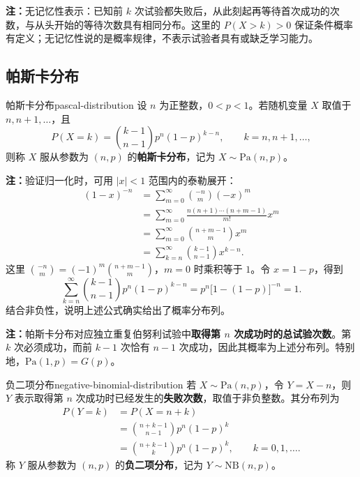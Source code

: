 \textbf{注：}\quad 无记忆性表示：已知前 $k$ 次试验都失败后，从此刻起再等待首次成功的次数，与从头开始的等待次数具有相同分布。这里的 $P(X>k)>0$ 保证条件概率有定义；无记忆性说的是概率规律，不表示试验者具有或缺乏学习能力。

\subsection*{帕斯卡分布}

\begin{mydefinition}{帕斯卡分布}{pascal-distribution}
设 $n$ 为正整数，$0<p<1$。若随机变量 $X$ 取值于 $n,n+1,\ldots$，且
\[
P(X=k)=\binom{k-1}{n-1}p^n(1-p)^{k-n},
\qquad k=n,n+1,\ldots,
\]
则称 $X$ 服从参数为 $(n,p)$ 的\textbf{帕斯卡分布}，记为 $X\sim\mathrm{Pa}(n,p)$。
\end{mydefinition}

\textbf{注：}\quad 验证归一化时，可用 $|x|<1$ 范围内的泰勒展开：
\[
\begin{aligned}
(1-x)^{-n}
&=\sum_{m=0}^{\infty}\binom{-n}{m}(-x)^m\\
&=\sum_{m=0}^{\infty}
\frac{n(n+1)\cdots(n+m-1)}{m!}x^m\\
&=\sum_{m=0}^{\infty}\binom{n+m-1}{m}x^m\\
&=\sum_{k=n}^{\infty}\binom{k-1}{n-1}x^{k-n}.
\end{aligned}
\]
这里 $\binom{-n}{m}=(-1)^m\binom{n+m-1}{m}$，$m=0$ 时乘积等于 $1$。令 $x=1-p$，得到
\[
\sum_{k=n}^{\infty}\binom{k-1}{n-1}p^n(1-p)^{k-n}
=p^n\bigl[1-(1-p)\bigr]^{-n}=1.
\]
结合非负性，说明上述公式确实给出了概率分布列。

\textbf{注：}\quad 帕斯卡分布对应独立重复伯努利试验中\textbf{取得第 $n$ 次成功时的总试验次数}。第 $k$ 次必须成功，而前 $k-1$ 次恰有 $n-1$ 次成功，因此其概率为上述分布列。特别地，$\mathrm{Pa}(1,p)=G(p)$。

\begin{mydefinition}{负二项分布}{negative-binomial-distribution}
若 $X\sim\mathrm{Pa}(n,p)$，令 $Y=X-n$，则 $Y$ 表示取得第 $n$ 次成功时已经发生的\textbf{失败次数}，取值于非负整数。其分布列为
\[
\begin{aligned}
P(Y=k)&=P(X=n+k)\\
&=\binom{n+k-1}{n-1}p^n(1-p)^k\\
&=\binom{n+k-1}{k}p^n(1-p)^k,\qquad k=0,1,\ldots.
\end{aligned}
\]
称 $Y$ 服从参数为 $(n,p)$ 的\textbf{负二项分布}，记为 $Y\sim\mathrm{NB}(n,p)$。
\end{mydefinition}

